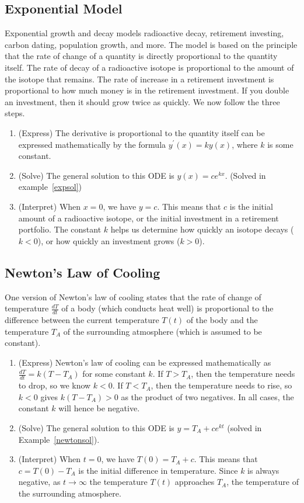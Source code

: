 \subsection{Exponential Model}
Exponential growth and decay models radioactive decay, retirement investing, carbon dating, population growth, and more. The model is based on the principle that the rate of change of a quantity is directly proportional to the quantity itself.  The rate of decay of a radioactive isotope is proportional to the amount of the isotope that remains.  The rate of increase in a retirement investment is proportional to how much money is in the retirement investment. If you double an investment, then it should grow twice as quickly. We now follow the three steps.
\begin{enumerate}
	\item (Express) The derivative is proportional to the quantity itself can be expressed mathematically by the formula $y^\prime(x)=ky(x)$, where $k$ is some constant. 
	\item (Solve)  The general solution to this ODE is $y(x) = ce^{kx}$. (Solved in example~\ref{expsol})
	\item (Interpret) When $x=0$, we have $y=c$. This means that $c$ is the initial amount of a radioactive isotope, or the initial investment in a retirement portfolio.  The constant $k$ helps us determine how quickly an isotope decays ($k<0$), or how quickly an investment grows ($k>0$).  
\end{enumerate}





\subsection{Newton's Law of Cooling}
One version of Newton's law of cooling states that the rate of change of temperature $\frac{dT}{dt}$ of a body (which conducts heat well) is proportional to the difference between the current temperature $T(t)$ of the body and the temperature $T_A$ of the surrounding atmosphere (which is assumed to be constant).
\begin{enumerate}
	\item (Express) Newton's law of cooling can be expressed mathematically as $ \frac{dT}{dt} = k(T-T_A)$ for some constant $k$.  If $T>T_A$, then the temperature needs to drop, so we know $k<0$. If $T<T_A$, then the temperature needs to rise, so $k<0$ gives $k(T-T_A)>0$ as the product of two negatives. In all cases, the constant $k$ will hence be negative.
	\item (Solve)  The general solution to this ODE is $y = T_A+ce^{kt}$ (solved in Example~\ref{newtonsol}).
	\item (Interpret) When $t=0$, we have $T(0)=T_A+c$. This means that $c=T(0)-T_A$ is the initial difference in temperature.  Since $k$ is always negative, as $t\to\infty$ the temperature $T(t)$ approaches $T_A$, the temperature of the surrounding atmosphere.  
\end{enumerate}

